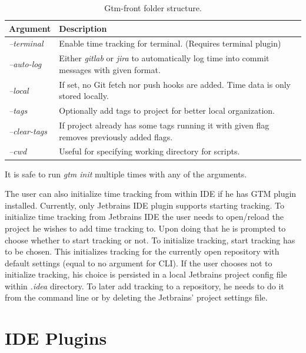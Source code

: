 \begin{table}[h]
    \centering
    \begin{tabular}{ | p{3cm} | p{10cm} |}
        \hline
        \textbf{Argument} & \textbf{Description}\\
        \hline
        \textit{--terminal} & Enable time tracking for terminal. (Requires terminal plugin)\\
        \hline
        \textit{--auto-log} & Either \textit{gitlab} or \textit{jira} to automatically log time
        into commit messages with given format.\\
        \hline
        \textit{--local} & If set, no Git fetch nor push hooks are added.
        Time data is only stored locally.\\
        \hline
        \textit{--tags} & Optionally add tags to project for better local organization.\\
        \hline
        \textit{--clear-tags} & If project already has some tags running it with given flag removes previously added flags.\\
        \hline
        \textit{--cwd} & Useful for specifying working directory for scripts.\\
        \hline
    \end{tabular}
    \caption{Gtm-front folder structure.}
    \label{tab:gtm-init}
\end{table}
It is safe to run \textit{gtm init} multiple times with any of the arguments.

The user can also initialize time tracking from within IDE if he has GTM plugin installed.
Currently, only Jetbrains IDE plugin supports starting tracking.
To initialize time tracking from Jetbrains IDE the user needs to open/reload the project he wishes to add time tracking to.
Upon doing that he is prompted to choose whether to start tracking or not.
To initialize tracking, start tracking has to be chosen.
This initializes tracking for the currently open repository with default settings (equal to no argument for CLI).
If the user chooses not to initialize tracking, his choice is persisted in a local Jetbrains project config file within \textit{.idea} directory.
To later add tracking to a repository, he needs to do it from the command line or by deleting the Jetbrains' project settings file.


\section{IDE Plugins}\label{sec:plugins}

